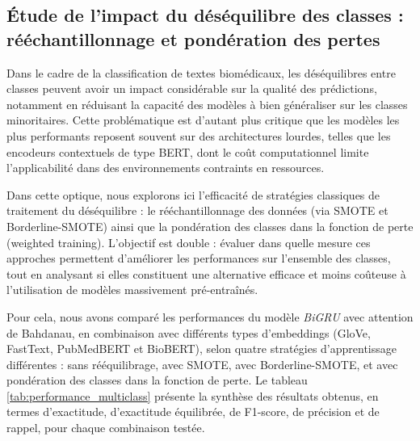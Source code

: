 \documentclass[12pt]{report}
\begin{document}
\subsection{Étude de l’impact du déséquilibre des classes : rééchantillonnage et pondération des pertes}

Dans le cadre de la classification de textes biomédicaux, les déséquilibres entre classes peuvent avoir un impact considérable sur la qualité des prédictions, notamment en réduisant la capacité des modèles à bien généraliser sur les classes minoritaires. Cette problématique est d’autant plus critique que les modèles les plus performants reposent souvent sur des architectures lourdes, telles que les encodeurs contextuels de type BERT, dont le coût computationnel limite l’applicabilité dans des environnements contraints en ressources.

Dans cette optique, nous explorons ici l’efficacité de stratégies classiques de traitement du déséquilibre : le rééchantillonnage des données (via SMOTE et Borderline-SMOTE) ainsi que la pondération des classes dans la fonction de perte (weighted training). L’objectif est double : évaluer dans quelle mesure ces approches permettent d’améliorer les performances sur l’ensemble des classes, tout en analysant si elles constituent une alternative efficace et moins coûteuse à l’utilisation de modèles massivement pré-entraînés.

Pour cela, nous avons comparé les performances du modèle \textit{BiGRU} avec attention de Bahdanau, en combinaison avec différents types d’embeddings (GloVe, FastText, PubMedBERT et BioBERT), selon quatre stratégies d’apprentissage différentes : sans rééquilibrage, avec SMOTE, avec Borderline-SMOTE, et avec pondération des classes dans la fonction de perte. Le tableau \ref{tab:performance_multiclass} présente la synthèse des résultats obtenus, en termes d’exactitude, d’exactitude équilibrée, de F1-score, de précision et de rappel, pour chaque combinaison testée.
\end{document}

